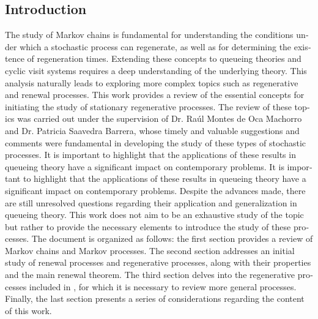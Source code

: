 \documentclass{article}
\renewcommand{\abstractname}{Resumen}
\numberwithin{equation}{section}
\begin{document}
\begin{otherlanguage}{english}
\section*{Introduction}

The study of Markov chains is fundamental for understanding the conditions under which a stochastic process can regenerate, as well as for determining the existence of regeneration times. Extending these concepts to queueing theories and cyclic visit systems requires a deep understanding of the underlying theory. This analysis naturally leads to exploring more complex topics such as regenerative and renewal processes. This work provides a review of the essential concepts for initiating the study of stationary regenerative processes. The review of these topics was carried out under the supervision of Dr. Raúl Montes de Oca Machorro and Dr. Patricia Saavedra Barrera, whose timely and valuable suggestions and comments were fundamental in developing the study of these types of stochastic processes. It is important to highlight that the applications of these results in queueing theory have a significant impact on contemporary problems. It is important to highlight that the applications of these results in queueing theory have a significant impact on contemporary problems. Despite the advances made, there are still unresolved questions regarding their application and generalization in queueing theory. This work does not aim to be an exhaustive study of the topic but rather to provide the necessary elements to introduce the study of these processes. The document is organized as follows: the first section provides a review of Markov chains and Markov processes. The second section addresses an initial study of renewal processes and regenerative processes, along with their properties and the main renewal theorem. The third section delves into the regenerative processes included in \cite{Thorisson}, for which it is necessary to review more general processes. Finally, the last section presents a series of considerations regarding the content of this work.

\end{otherlanguage}
\end{document}
